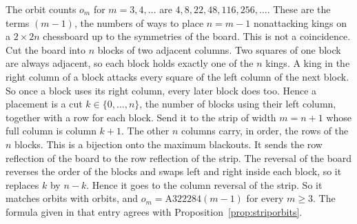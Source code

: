 \begin{remark}\label{rem:kings}
The orbit counts $o_m$ for $m=3,4,\ldots$ are $4,8,22,48,116,256,\ldots$. These are
the terms $(m-1)$, the numbers of ways to place $n=m-1$
nonattacking kings on a $2\times2n$ chessboard up to the symmetries of the board.
This is not a coincidence. Cut the board into $n$ blocks of two adjacent columns.
Two squares of one block are always adjacent, so each block holds exactly one of the
$n$ kings. A king in the right column of a block
attacks every square of the left column of the next block. So once a block uses its
right column, every later block does too. Hence a placement is a cut
$k\in\{0,\dots,n\}$, the number of blocks using their left column, together with a
row for each block. Send it to the strip of width $m=n+1$ whose full column is
column $k+1$. The other $n$ columns carry, in order, the rows of the $n$ blocks.
This is a bijection onto the maximum blackouts. It sends the row reflection
of the board to the row reflection of the strip. The reversal of the board reverses
the order of the blocks and swaps left and right inside each block, so it replaces
$k$ by $n-k$. Hence it goes to the column reversal of the strip. So it matches orbits
with orbits, and $o_m=\mathrm{A322284}(m-1)$ for every $m\ge3$. The formula given in
that entry agrees with Proposition~\ref{prop:striporbits}.
\end{remark}
